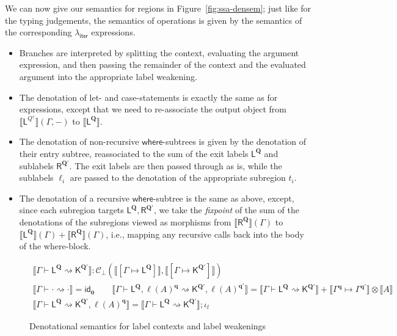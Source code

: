 \documentclass[acmsmall,screen,review]{acmart}
\newcommand{\mc}[1]{\ensuremath{\mathcal{#1}}}
\newcommand{\mb}[1]{\ensuremath{\mathbf{#1}}}
\newcommand{\ms}[1]{\ensuremath{\mathsf{#1}}}
\newcommand{\cwk}[2]{#1 \mapsto #2}
\newcommand{\lwk}[3]{#1 \vdash #2 \rightsquigarrow #3}
\newcommand{\lhyp}[2]{#1(#2)}
\newcommand{\ltoty}[2]{[#1 \mapsto #2]}
\newcommand{\dnt}[1]{\llbracket{#1}\rrbracket}
\newcommand{\subiterexp}{\texorpdfstring{\(\lambda_{\ms{iter}}\)}{lambda-iter}}
\newcommand{\zeroqv}[1]{#1^\uparrow}
\begin{document}
We can now give our semantics for regions in Figure~\ref{fig:ssa-densem}; just like for the typing
judgements, the semantics of operations is given by the semantics of the corresponding \subiterexp{}
expressions.
\begin{itemize}
  \item Branches are interpreted by splitting the context, evaluating the argument expression,
  and then passing the remainder of the context and the evaluated argument into the appropriate
  label weakening.
  \item The denotation of let- and case-statements is exactly the same as for expressions,
  except that we need to re-associate the output object from 
  $\dnt{\ms{L}^{\zeroqv{Q}}}(\Gamma, -)$ to $\dnt{\ms{L}^{\mb{Q}}}$.
  \item The denotation of non-recursive \ms{where}-subtrees is given by the denotation of their
  entry subtree, reassociated to the sum of the exit labels $\ms{L}^{\mb{Q}}$ and sublabels 
  $\ms{R}^{\mb{Q}'}$. The exit labels are then passed through as is, while the sublabels $\ell_i$ 
  are passed to the denotation of the appropriate subregion $t_i$.
  \item The denotation of a recursive \ms{where}-subtree is the same as above, except, since each
  subregion targets $\ms{L}^{\mb{Q}}, \ms{R}^{\mb{Q}'}$, we take the \emph{fixpoint} of the sum
  of the denotations of the subregions viewed as morphisms from $\dnt{\ms{R}^{\mb{Q}}}(\Gamma)$
  to $\dnt{\ms{L}^{\mb{Q}}}(\Gamma) + \dnt{\ms{R}^{\mb{Q}}}(\Gamma)$, i.e., mapping any recursive
  calls back into the body of the where-block.
\end{itemize}

\begin{figure}
  \begin{gather*}
    \boxed{\dnt{\lwk{\Gamma}{\ms{L}^{\mb{Q}}}{\ms{K}^{\mb{Q}'}}} 
      : \mc{C}_\bot(\dnt{\ltoty{\Gamma}{\ms{L}^{\mb{Q}}}}, 
                    \dnt{\ltoty{\Gamma}{\ms{K}^{\mb{Q}'}}})} \\
    \dnt{\lwk{\Gamma}{\cdot}{\cdot}} = \ms{id}_{\mb{0}} \qquad
    \dnt
      {\lwk{\Gamma}{\ms{L}^{\mb{Q}}, \lhyp{\ell}{A}^{\mb{q}}}
      {\ms{K}^{\mb{Q}'}, \lhyp{\ell}{A}^{\mb{q}'}}}
    = \dnt{\lwk{\Gamma}{\ms{L}^{\mb{Q}}}{\ms{K}^{\mb{Q}'}}} 
      + \dnt{\cwk{\Gamma^{\mb{q}}}{\Gamma^{\mb{q}'}}} \otimes \dnt{A} \\
    \dnt
      {\lwk{\Gamma}{\ms{L}^{\mb{Q}}}
      {\ms{K}^{\mb{Q}'}, \lhyp{\ell}{A}^{\mb{q}}}}
    = \dnt{\lwk{\Gamma}{\ms{L}^{\mb{Q}}}{\ms{K}^{\mb{Q}'}}} ; \iota_l
  \end{gather*}
  \caption{Denotational semantics for label contexts and label weakenings}
  \Description{}
  \label{fig:lwk-densem}
\end{figure}
\end{document}
